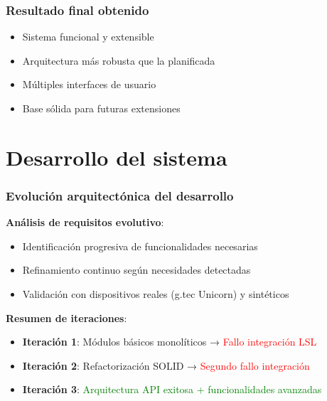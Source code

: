 \documentclass[10pt,thmsa]{beamer}
\theoremstyle{plain}
\begin{document}
\begin{frame}
\frametitle{Resultado final obtenido}

\begin{itemize}
\item Sistema funcional y extensible
\item Arquitectura más robusta que la planificada
\item Múltiples interfaces de usuario
\item Base sólida para futuras extensiones
\end{itemize}

\end{frame}

\section{Desarrollo del sistema}

\begin{frame}
\frametitle{Evolución arquitectónica del desarrollo}

\textbf{Análisis de requisitos evolutivo}:
\begin{itemize}
\item Identificación progresiva de funcionalidades necesarias
\item Refinamiento continuo según necesidades detectadas
\item Validación con dispositivos reales (g.tec Unicorn) y sintéticos
\end{itemize}

\vspace{1em}

\textbf{Resumen de iteraciones}:
\begin{itemize}
\item \textbf{Iteración 1}: Módulos básicos monolíticos → \textcolor{red}{Fallo integración LSL}
\item \textbf{Iteración 2}: Refactorización SOLID → \textcolor{red}{Segundo fallo integración}
\item \textbf{Iteración 3}: \textcolor{green}{Arquitectura API exitosa + funcionalidades avanzadas}
\end{itemize}

\end{frame}
\end{document}
